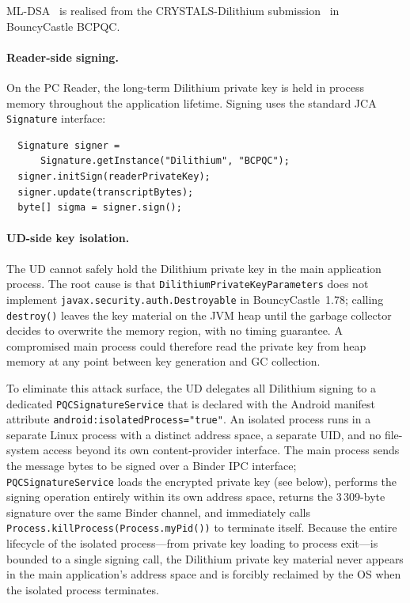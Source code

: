 ML-DSA~\cite{NIST:FIPS204} is realised from the CRYSTALS-Dilithium
submission~\cite{TCHES:DKLLSSS18} in BouncyCastle BCPQC.

\paragraph{Reader-side signing.}
On the PC Reader, the long-term Dilithium private key is held in process
memory throughout the application lifetime.
Signing uses the standard JCA \texttt{Signature} interface:
\begin{verbatim}
  Signature signer =
      Signature.getInstance("Dilithium", "BCPQC");
  signer.initSign(readerPrivateKey);
  signer.update(transcriptBytes);
  byte[] sigma = signer.sign();
\end{verbatim}

\paragraph{UD-side key isolation.}
The UD cannot safely hold the Dilithium private key in the main application
process.
The root cause is that \texttt{DilithiumPrivateKeyParameters} does not
implement \texttt{javax.security.auth.Destroyable} in BouncyCastle~1.78;
calling \texttt{destroy()} leaves the key material on the JVM heap until the
garbage collector decides to overwrite the memory region, with no timing
guarantee.
A compromised main process could therefore read the private key from heap
memory at any point between key generation and GC collection.

To eliminate this attack surface, the UD delegates all Dilithium signing to a
dedicated \texttt{PQCSignatureService} that is declared with the Android
manifest attribute \texttt{android:isolatedProcess="true"}.
An isolated process runs in a separate Linux process with a distinct address
space, a separate UID, and no file-system access beyond its own
content-provider interface.
The main process sends the message bytes to be signed over a Binder IPC
interface; \texttt{PQCSignatureService} loads the encrypted private key (see
below), performs the signing operation entirely within its own address space,
returns the 3\,309-byte signature over the same Binder channel, and
immediately calls \texttt{Process.killProcess(Process.myPid())} to terminate
itself.
Because the entire lifecycle of the isolated process---from private key
loading to process exit---is bounded to a single signing call, the Dilithium
private key material never appears in the main application's address space and
is forcibly reclaimed by the OS when the isolated process terminates.


